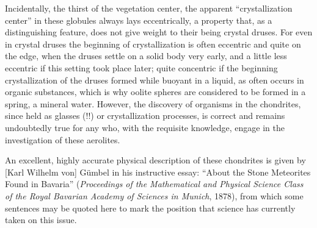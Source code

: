 \documentclass[a4paper, 12pt, oneside]{article}
\begin{document}
Incidentally, the thirst of the vegetation center, the apparent ``crystallization center'' in these globules always lays eccentrically, a property that, as a distinguishing feature, does not give weight to their being crystal druses. For even in crystal druses the beginning of crystallization is often eccentric and quite on the edge, when the druses settle on a solid body very early, and a little less eccentric if this setting took place later; quite concentric if the beginning crystallization of the druses formed while buoyant in a liquid, as often occurs in organic substances, which is why oolite spheres are considered to be formed in a spring, a mineral water. However, the discovery of organisms in the chondrites, since held as glasses (!!) or crystallization processes, is correct and remains undoubtedly true for any who, with the requisite knowledge, engage in the investigation of these aerolites.

An excellent, highly accurate physical description of these chondrites is given by [Karl Wilhelm von] Gümbel in his instructive essay: ``About the Stone Meteorites Found in Bavaria'' (\emph{Proceedings of the Mathematical and Physical Science Class of the Royal Bavarian Academy of Sciences in Munich}, 1878), from which some sentences may be quoted here to mark the position that science has currently taken on this issue.
\end{document}
